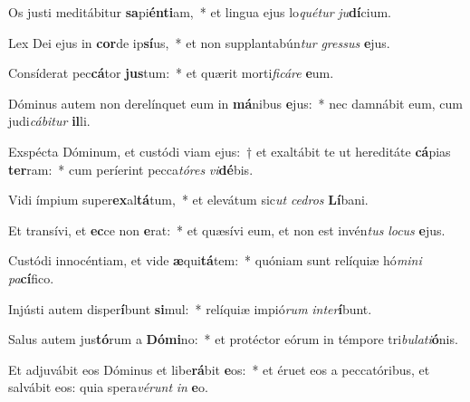 \item Os justi meditábitur \textbf{sa}pi\textbf{én}\textbf{ti}am,~* et lingua ejus lo\textit{qué}\textit{tur} \textit{ju}\textbf{dí}cium.
\item Lex Dei ejus in \textbf{cor}de ip\textbf{sí}us,~* et non supplantabún\textit{tur} \textit{gres}\textit{sus} \textbf{e}jus.
\item Consíderat pec\textbf{cá}tor \textbf{jus}tum:~* et quærit morti\textit{fi}\textit{cá}\textit{re} \textbf{e}um.
\item Dóminus autem non derelínquet eum in \textbf{má}nibus \textbf{e}jus:~* nec damnábit eum, cum judi\textit{cá}\textit{bi}\textit{tur} \textbf{il}li.
\item Exspécta Dóminum, et custódi viam ejus:~† et exaltábit te ut hereditáte \textbf{cá}pias \textbf{ter}ram:~* cum períerint pecca\textit{tó}\textit{res} \textit{vi}\textbf{dé}bis.
\item Vidi ímpium super\textbf{ex}al\textbf{tá}tum,~* et elevátum sic\textit{ut} \textit{ce}\textit{dros} \textbf{Lí}bani.
\item Et transívi, et \textbf{ec}ce non \textbf{e}rat:~* et quæsívi eum, et non est invén\textit{tus} \textit{lo}\textit{cus} \textbf{e}jus.
\item Custódi innocéntiam, et vide \textbf{æ}qui\textbf{tá}tem:~* quóniam sunt relíquiæ hó\textit{mi}\textit{ni} \textit{pa}\textbf{cí}fico.
\item Injústi autem disper\textbf{í}bunt \textbf{si}mul:~* relíquiæ impió\textit{rum} \textit{in}\textit{ter}\textbf{í}bunt.
\item Salus autem jus\textbf{tó}rum a \textbf{Dó}\textbf{mi}no:~* et protéctor eórum in témpore tri\textit{bu}\textit{la}\textit{ti}\textbf{ó}nis.
\item Et adjuvábit eos Dóminus et libe\textbf{rá}bit \textbf{e}os:~* et éruet eos a peccatóribus, et salvábit eos: quia spera\textit{vé}\textit{runt} \textit{in} \textbf{e}o.
